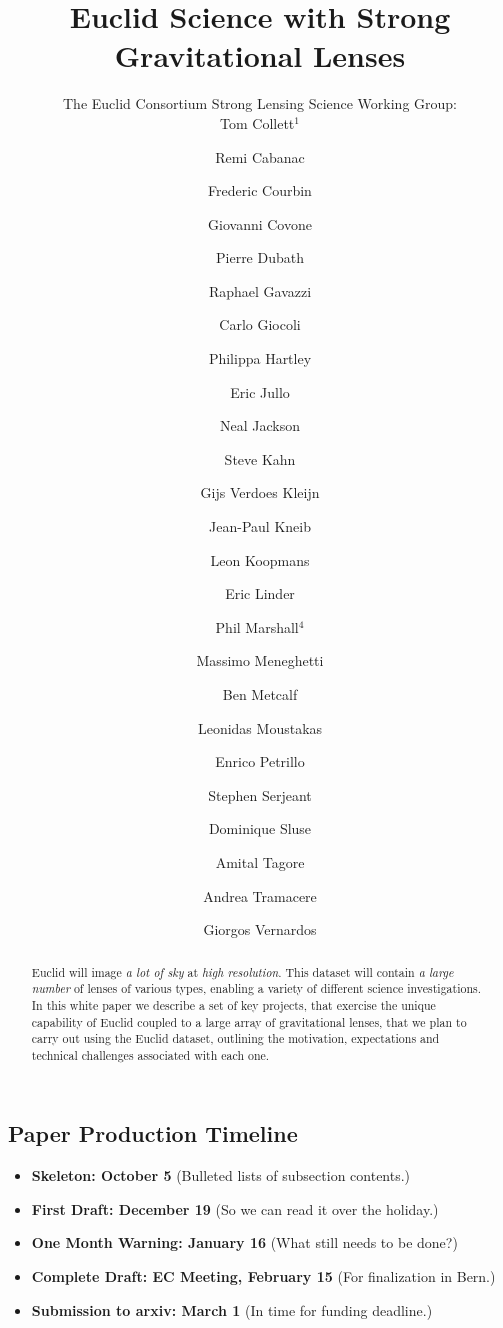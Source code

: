\documentclass[twocolumn]{svjour3}
\begin{document}
\title{Euclid Science with Strong Gravitational Lenses}

\author{The Euclid Consortium Strong Lensing Science Working Group:\\
Tom Collett$^1$ \and
Remi Cabanac \and
Frederic Courbin \and
Giovanni Covone \and
Pierre Dubath \and
Raphael Gavazzi \and
Carlo Giocoli \and
Philippa Hartley \and
Eric Jullo \and
Neal Jackson \and
Steve Kahn \and
Gijs Verdoes Kleijn \and
Jean-Paul Kneib \and
Leon Koopmans \and
Eric Linder \and
Phil Marshall$^4$ \and
Massimo Meneghetti \and
Ben Metcalf \and
Leonidas Moustakas \and
Enrico Petrillo \and
Stephen Serjeant \and
Dominique Sluse \and
Amital Tagore \and
Andrea Tramacere \and
Giorgos Vernardos
}



\maketitle


\begin{abstract}
\noindent Euclid will image \emph{a lot of sky} at \emph{high
resolution}. This dataset will contain {\it a large number} of lenses of
various types, enabling a variety  of different  science investigations.
In this white paper we describe a set of key projects, that exercise the
unique capability of Euclid coupled to a large array of gravitational
lenses, that we plan to carry out using the Euclid dataset, outlining
the motivation, expectations and technical challenges associated with
each one.
\end{abstract}


\subsection*{Paper Production Timeline}
\begin{itemize}
    \item {\bf Skeleton: October 5} (Bulleted lists of subsection contents.)
    \item {\bf First Draft: December 19} (So we can read it over the holiday.)
    \item {\bf One Month Warning: January 16} (What still needs to be done?)
    \item {\bf Complete Draft: EC Meeting, February 15} (For finalization in Bern.)
    \item {\bf Submission to arxiv: March 1} (In time for funding deadline.)
\end{itemize}
\end{document}
